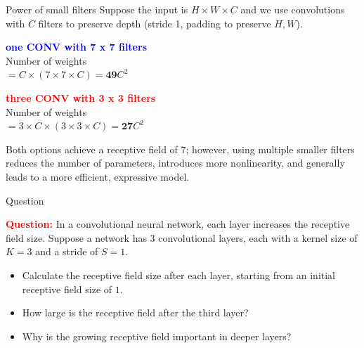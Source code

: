 \documentclass[default, aspectratio=169]{beamer}
\begin{document}
	\begin{frame}{Power of small filters}
		Suppose the input is $H \times W \times C$ and we use convolutions with $C$ filters to preserve depth (stride 1, padding to preserve $H, W$).
		
		\bigskip
		\begin{minipage}{0.45\textwidth}
			\textcolor{blue}{\textbf{one CONV with 7 x 7 filters}} \\
			Number of weights \\
			$= C \times (7 \times 7 \times C) = \textbf{49} C^2$
		\end{minipage}
		\hfill
		\begin{minipage}{0.45\textwidth}
			\textcolor{red}{\textbf{three CONV with 3 x 3 filters}} \\
			Number of weights \\
			$= 3 \times C \times (3 \times 3 \times C) = \textbf{27} C^2$
		\end{minipage}
		\bigskip
		\begin{flushleft}
			Both options achieve a receptive field of 7; however, using multiple smaller filters reduces the number of parameters, introduces more nonlinearity, and generally leads to a more efficient, expressive model.
		\end{flushleft}
	\end{frame}
	
	\begin{frame}{Question}
			\item \textcolor{red}{\textbf{Question:}} In a convolutional neural network, each layer increases the receptive field size. 
			Suppose a network has 3 convolutional layers, each with a kernel size of \( K = 3 \) and a stride of \( S = 1 \).
			\begin{itemize}
				\item Calculate the receptive field size after each layer, starting from an initial receptive field size of \( 1 \).
				\item How large is the receptive field after the third layer?
				\item Why is the growing receptive field important in deeper layers?
			\end{itemize}
	\end{frame}
	
\end{document}
